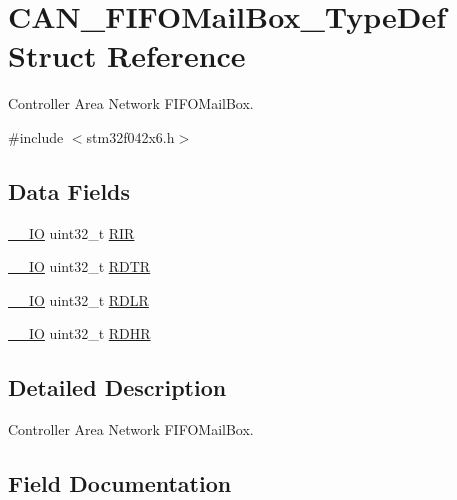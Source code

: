 \hypertarget{struct_c_a_n___f_i_f_o_mail_box___type_def}{}\section{C\+A\+N\+\_\+\+F\+I\+F\+O\+Mail\+Box\+\_\+\+Type\+Def Struct Reference}
\label{struct_c_a_n___f_i_f_o_mail_box___type_def}


Controller Area Network F\+I\+F\+O\+Mail\+Box.  




{\ttfamily \#include $<$stm32f042x6.\+h$>$}

\subsection*{Data Fields}
\begin{DoxyCompactItemize}
\item 
\hyperlink{core__sc300_8h_aec43007d9998a0a0e01faede4133d6be}{\+\_\+\+\_\+\+IO} uint32\+\_\+t \hyperlink{struct_c_a_n___f_i_f_o_mail_box___type_def_a0acc8eb90b17bef5b9e03c7ddaacfb0b}{R\+IR}
\item 
\hyperlink{core__sc300_8h_aec43007d9998a0a0e01faede4133d6be}{\+\_\+\+\_\+\+IO} uint32\+\_\+t \hyperlink{struct_c_a_n___f_i_f_o_mail_box___type_def_a9563d8a88d0db403b8357331bea83a2e}{R\+D\+TR}
\item 
\hyperlink{core__sc300_8h_aec43007d9998a0a0e01faede4133d6be}{\+\_\+\+\_\+\+IO} uint32\+\_\+t \hyperlink{struct_c_a_n___f_i_f_o_mail_box___type_def_ae1c569688eedd49219cd505b9c22121b}{R\+D\+LR}
\item 
\hyperlink{core__sc300_8h_aec43007d9998a0a0e01faede4133d6be}{\+\_\+\+\_\+\+IO} uint32\+\_\+t \hyperlink{struct_c_a_n___f_i_f_o_mail_box___type_def_a7f11f42ba9d3bc5cd4a4f5ea0214608e}{R\+D\+HR}
\end{DoxyCompactItemize}


\subsection{Detailed Description}
Controller Area Network F\+I\+F\+O\+Mail\+Box. 

\subsection{Field Documentation}
\mbox{\label{struct_c_a_n___f_i_f_o_mail_box___type_def_a7f11f42ba9d3bc5cd4a4f5ea0214608e}} 
